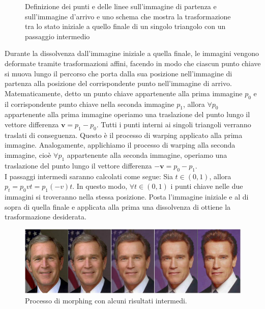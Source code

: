 \begin{figure}[htb]
\caption{Definizione dei punti e delle linee sull'immagine di partenza e sull'immagine d'arrivo \cite{morphing} e uno schema che mostra la trasformazione tra lo stato iniziale a quello finale di un singolo triangolo con un passaggio intermedio}
\end{figure}

\noindent
Durante la dissolvenza dall'immagine iniziale a quella finale, le immagini vengono deformate tramite trasformazioni affini, facendo in modo che ciascun punto chiave si muova lungo il percorso che porta dalla sua posizione nell'immagine di partenza alla posizione del corrispondente punto nell'immagine di arrivo.
\noindent
Matematicamente, detto un punto chiave appartenente alla prima immagine \textbf{$p_0$} e il corrispondente punto chiave nella seconda immagine \textbf{$p_1$}, allora $\forall p_0$ appartenente alla prima immagine operiamo una traslazione del punto lungo il vettore differenza 
$\textbf{v}=\textbf{$p_1$}-\textbf{$p_0$}$. Tutti i punti interni ai singoli triangoli verranno traslati di conseguenza. Questo è il processo di warping applicato alla prima immagine. Analogamente, applichiamo il processo di warping alla seconda immagine, cioè $\forall p_1$ appartenente alla seconda immagine, operiamo una traslazione del punto lungo il vettore differenza $-\textbf{v}=\textbf{$p_0$}-\textbf{$p_1$}$.\\
I passaggi intermedi saranno calcolati come segue:
Sia $t \in (0,1)$, allora $p_t=p_0vt=p_1(-v)t$. In questo modo, $\forall t \in (0,1)$ i punti chiave nelle due immagini si troveranno nella stessa posizione. Posta l'immagine iniziale e al di sopra di quella finale e applicata alla prima una dissolvenza di ottiene la trasformazione desiderata.

\begin{figure}[htb] \centering
\includegraphics[scale=0.5, trim = 0 1.1cm 0 0, clip]{Pictures/Striscia_morphing.jpg}
\caption{Processo di morphing con alcuni risultati intermedi.}\label{fig:figura}
\end{figure}
